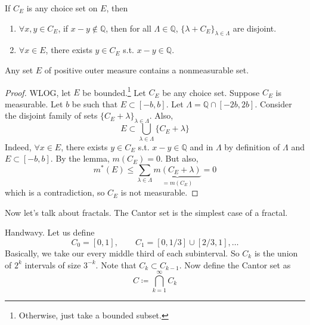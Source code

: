   \begin{lemma} 
    If $C_E$ is any choice set on $E$, then 
    \begin{enumerate}
      \item $\forall x, y \in C_E$, if $x - y \not\in \mathbb{Q}$, then for all $\Lambda \in \mathbb{Q}$, $\{\lambda + C_E\}_{\lambda \in \Lambda}$ are disjoint. 
      \item $\forall x \in E$, there exists $y \in C_E$ s.t. $x - y \in \mathbb{Q}$. 
    \end{enumerate}
  \end{lemma}

  \begin{theorem}
    Any set $E$ of positive outer measure contains a nonmeasurable set. 
  \end{theorem}
  \begin{proof}
    WLOG, let $E$ be bounded.\footnote{Otherwise, just take a bounded subset.} Let $C_E$ be any choice set. Suppose $C_E$ is measurable. Let $b$ be such that $E \subset [-b, b]$. Let $\Lambda = \mathbb{Q} \cap [-2b, 2b]$. Consider the disjoint family of sets $\{C_E + \lambda\}_{\lambda \in \Lambda}$. Also, 
    \begin{equation}
      E \subset \bigcup_{\lambda \in \Lambda} \{ C_E + \lambda \}
    \end{equation}
    Indeed, $\forall x \in E$, there exists $y \in C_E$ s.t. $x - y \in \mathbb{Q}$ and in $\Lambda$ by definition of $\Lambda$ and $E \subset [-b, b]$. By the lemma, $m(C_E) = 0$. But also, 
    \begin{equation}
      m^\ast (E) \leq \sum_{\lambda \in \Lambda} \underbrace{m(C_E + \lambda)}_{= m(C_E)} = 0
    \end{equation}
    which is a contradiction, so $C_E$ is not measurable. 
  \end{proof}

  Now let's talk about fractals. The Cantor set is the simplest case of a fractal. 

  \begin{definition}
    Handwavy. Let us define 
    \begin{equation}
      C_0 = [0, 1], \qquad C_1 = [0, 1/3] \cup [2/3, 1], \ldots
    \end{equation}
    Basically, we take our every middle third of each subinterval. So $C_k$ is the union of $2^k$ intervals of size $3^{-k}$. Note that $C_k \subset C_{k-1}$. Now define the Cantor set as 
    \begin{equation}
      C \coloneqq \bigcap_{k=1}^\infty C_k
    \end{equation}
  \end{definition}

